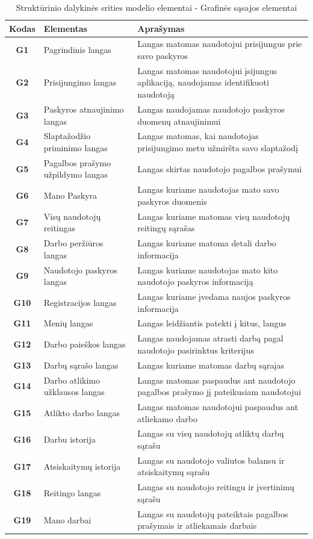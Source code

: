 \documentclass{VUMIFPSbakalaurinis}
\begin{document}
\begin{table}[H]\footnotesize
	\centering
	\caption{Struktūrinio dalykinės srities modelio elementai - Grafinės sąsajos elementai}
	{
	\setlength{\arrayrulewidth}{0.25mm}
	{\begin{tabular}{|c|m{5.75cm}|m{5.75cm}|} \hline
		Kodas & Elementas & Aprašymas \\
		\hline
		\textbf{G1} & Pagrindinis langas & Langas matomas naudotojui prisijungus prie savo paskyros \\
		\textbf{G2} & Prisijungimo langas & Langas matomas naudotojui įsijungus aplikaciją, naudojamas identifikuoti naudotoją \\
		\textbf{G3} & Paskyros atnaujinimo langas & Langas naudojamas naudotojo paskyros duomenų atnaujinimui \\
		\textbf{G4} & Slaptažodžio priminimo langas & Langas matomas, kai naudotojas prisijungimo metu užmiršta savo slaptažodį \\
		\textbf{G5} & Pagalbos prašymo užpildymo langas & Langas skirtas naudotojo pagalbos prašymui \\
		\textbf{G6} & Mano Paskyra & Langas kuriame naudotojas mato savo paskyros duomenis \\
		\textbf{G7} & Visų naudotojų reitingas & Langas kuriame matomas visų naudotojų reitingų sąrašas \\
		\textbf{G8} & Darbo peržiūros langas & Langas kuriame matoma detali darbo informacija \\
		\textbf{G9} & Naudotojo paskyros langas & Langas kuriame naudotojas mato kito naudotojo paskyros informaciją \\
		\textbf{G10} & Registracijos langas & Langas kuriame įvedama naujos paskyros informacija \\
		\textbf{G11} & Menių langas & Langas leidžiantis patekti į kitus, langus \\
		\textbf{G12} & Darbo paieškos langas & Langas naudojamas atrasti darbą pagal naudotojo pasirinktus kriterijus \\
		\textbf{G13} & Darbų sąrašo langas & Langas kuriame matomas darbų sąraįas \\
		\textbf{G14} & Darbo atlikimo užklausos langas & Langas matomas paspaudus ant naudotojo pagalbos prašymo jį pateikusiam naudotojui \\
		\textbf{G15} & Atlikto darbo langas  & Langas matomas naudotojui paspaudus ant atliekamo darbo \\
		\textbf{G16} & Darbu istorija & Langas su visų naudotojų atliktų darbų sąrašu \\
		\textbf{G17} & Atsiskaitymų istorija & Langas su naudotojo valiutos balansu ir atsiskaitymų sąrašu \\
		\textbf{G18} & Reitingo langas & Langas su naudotojo reitingu ir įvertinimų sąrašu \\
		\textbf{G19} & Mano darbai & Langas su naudotojų pateiktais pagalbos prašymais ir atliekamais darbais \\
		\hline
	\end{tabular}}
	
	}
	\label{tab:entity table}
\end{table}
\end{document}
